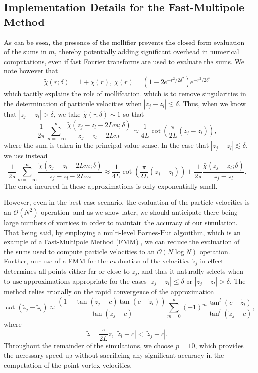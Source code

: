 \documentclass[a4paper,11pt]{article}
\begin{document}
\subsection*{Implementation Details for the Fast-Multipole Method}
As can be seen, the presence of the mollifier prevents the closed form evaluation of the sums in $m$, thereby potentially adding significant overhead in numerical computations, even if fast Fourier transforms are used to evaluate the sums.  We note however that 
\[
\tilde{\chi}(r;\delta) = 1 + \bar{\chi}(r), ~ \bar{\chi}(r) = \left(1-2e^{-r^2/2\delta^{2}} \right)e^{-r^2/2\delta^{2}}
\]
which tacitly explains the role of mollifcation, which is to remove singularities in the determination of particule velocities when $\left|z_{j}-z_{l} \right|\lesssim \delta$.  Thus, when we know that $\left|z_{j}-z_{l} \right| > \delta$, we take $\tilde{\chi}(r;\delta) \sim 1$ so that 
\[
\frac{1}{2\pi}\sum_{m=-\infty}^{\infty} \frac{\tilde{\chi}(z_{j}-z_{l}-2Lm;\delta)}{z_{j}-z_{l}-2Lm} \approx \frac{1}{4L}\cot\left(\frac{\pi}{2L}\left(z_{j}-z_{l}\right) \right),
\]
where the sum is taken in the principal value sense.  In the case that $\left|z_{j}-z_{l} \right|\lesssim \delta$, we use instead 
\[
\frac{1}{2\pi}\sum_{m=-\infty}^{\infty} \frac{\tilde{\chi}(z_{j}-z_{l}-2Lm;\delta)}{z_{j}-z_{l}-2Lm} \approx \frac{1}{4L}\cot\left(\frac{\pi}{2L}\left(z_{j}-z_{l}\right) \right) + \frac{1}{2\pi}\frac{\bar{\chi}(z_{j}-z_{l};\delta)}{z_{j}-z_{l}}.
\]
The error incurred in these approximations is only exponentially small.  

However, even in the best case scenario, the evaluation of the particle velocities is an $\mathcal{O}(N^{2})$ operation, and as we show later, we should anticipate there being large numbers of vortices in order to maintain the accuracy of our simulation.  That being said, by employing a multi-level Barnes-Hut algorithm, which is an example of a Fast-Multipole Method (FMM) \cite{greengard}, we can reduce the evaluation of the sums used to compute particle velocities to an $\mathcal{O}(N\log N)$ operation.  Further, our use of a FMM for the evaluation of the velocities $\dot{z}_{j}$ in effect determines all points either far or close to $z_{j}$, and thus it naturally selects when to use approximations appropriate for the cases  $|z_{j}-z_{l}|\leq\delta$ or $|z_{j}-z_{l}|>\delta$.  The method relies crucially on the rapid convergence of the approximation
\[
\cot\left(\tilde{z}_{j}-\tilde{z}_{l} \right) \approx \frac{\left(1-\tan(\tilde{z}_{j}-c)\tan(c-\tilde{z}_{l})\right)}{\tan\left(\tilde{z}_{j}-c\right)}\sum_{m=0}^{p}(-1)^{m}\frac{\tan^{l}\left(c-\tilde{z}_{l}\right)}{\tan^{l}\left(\tilde{z}_{j}-c\right)}, 
\]   
where
\[
\tilde{z} = \frac{\pi}{2L}z, ~ \left|\tilde{z}_{l}-c\right|<\left|\tilde{z}_{j}-c\right|.
\]
Throughout the remainder of the simulations, we choose $p=10$, which provides the necessary speed-up without sacrificing any significant accuracy in the computation of the point-vortex velocities.  
\end{document}
